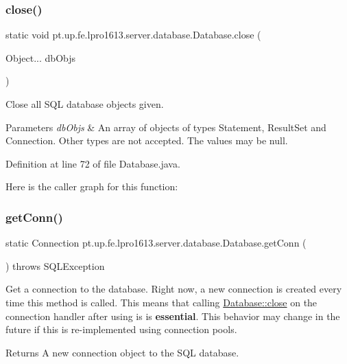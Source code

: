 \subsubsection{\texorpdfstring{close()}{close()}}
{\footnotesize\ttfamily static void pt.\+up.\+fe.\+lpro1613.\+server.\+database.\+Database.\+close (\begin{DoxyParamCaption}\item[{Object...}]{db\+Objs }\end{DoxyParamCaption})\hspace{0.3cm}{\ttfamily [static]}}

Close all S\+QL database objects given. 
\begin{DoxyParams}{Parameters}
{\em db\+Objs} & An array of objects of types {\ttfamily Statement}, {\ttfamily Result\+Set} and {\ttfamily Connection}. Other types are not accepted. The values may be null. \\
\hline
\end{DoxyParams}


Definition at line 72 of file Database.\+java.

Here is the caller graph for this function\+:
\hypertarget{classpt_1_1up_1_1fe_1_1lpro1613_1_1server_1_1database_1_1_database_aa5ecc24c87d16ca20cc645414d8f3232}{}\label{classpt_1_1up_1_1fe_1_1lpro1613_1_1server_1_1database_1_1_database_aa5ecc24c87d16ca20cc645414d8f3232} 
\subsubsection{\texorpdfstring{get\+Conn()}{getConn()}}
{\footnotesize\ttfamily static Connection pt.\+up.\+fe.\+lpro1613.\+server.\+database.\+Database.\+get\+Conn (\begin{DoxyParamCaption}{ }\end{DoxyParamCaption}) throws S\+Q\+L\+Exception\hspace{0.3cm}{\ttfamily [static]}}

Get a connection to the database. Right now, a new connection is created every time this method is called. This means that calling {\ttfamily \hyperlink{classpt_1_1up_1_1fe_1_1lpro1613_1_1server_1_1database_1_1_database_ae7e6a39f412e24bea44477224f0fdef0}{Database\+::close}} on the connection handler after using is is {\bfseries essential}. This behavior may change in the future if this is re-\/implemented using connection pools. \begin{DoxyReturn}{Returns}
A new connection object to the S\+QL database. 
\end{DoxyReturn}

